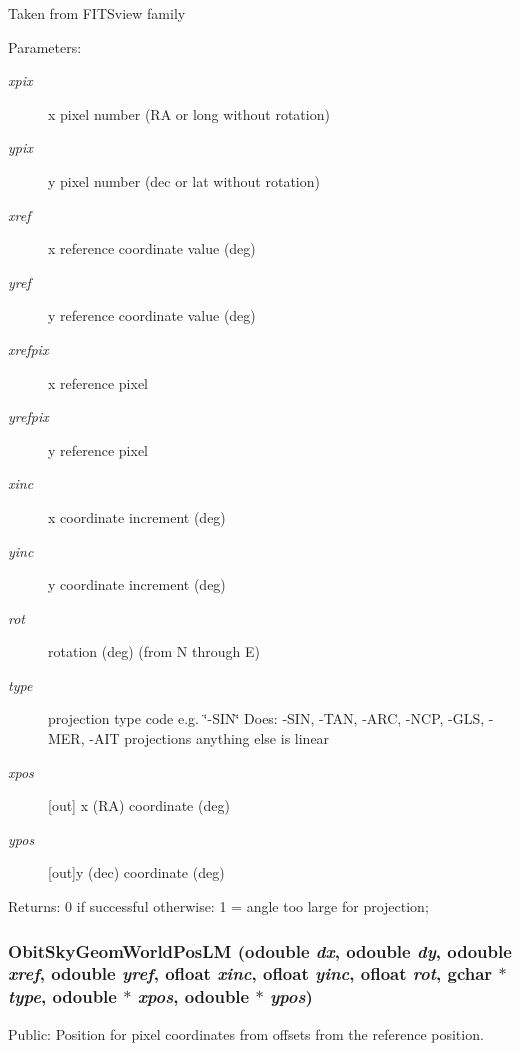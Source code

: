 Taken from FITSview family \begin{Desc}
\item[Parameters:]
\begin{description}
\item[{\em xpix}]x pixel number (RA or long without rotation) \item[{\em ypix}]y pixel number (dec or lat without rotation) \item[{\em xref}]x reference coordinate value (deg) \item[{\em yref}]y reference coordinate value (deg) \item[{\em xrefpix}]x reference pixel \item[{\em yrefpix}]y reference pixel \item[{\em xinc}]x coordinate increment (deg) \item[{\em yinc}]y coordinate increment (deg) \item[{\em rot}]rotation (deg) (from N through E) \item[{\em type}]projection type code e.g. \char`\"{}-SIN\char`\"{} Does: -SIN, -TAN, -ARC, -NCP, -GLS, -MER, -AIT projections anything else is linear \item[{\em xpos}][out] x (RA) coordinate (deg) \item[{\em ypos}][out]y (dec) coordinate (deg) \end{description}
\end{Desc}
\begin{Desc}
\item[Returns:]0 if successful otherwise: 1 = angle too large for projection; \end{Desc}
\subsubsection{ Obit\-Sky\-Geom\-World\-Pos\-LM ({\bf odouble} {\em dx}, {\bf odouble} {\em dy}, {\bf odouble} {\em xref}, {\bf odouble} {\em yref}, {\bf ofloat} {\em xinc}, {\bf ofloat} {\em yinc}, {\bf ofloat} {\em rot}, gchar $\ast$ {\em type}, {\bf odouble} $\ast$ {\em xpos}, {\bf odouble} $\ast$ {\em ypos})}\label{ObitSkyGeom_8h_a17}


Public: Position for pixel coordinates from offsets from the reference position. 

